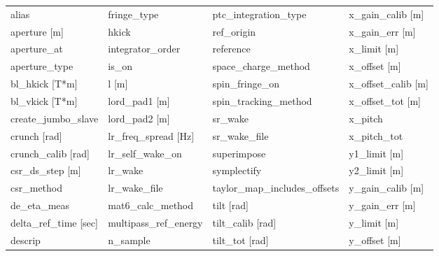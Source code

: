  \begin{tabular}{llll} \toprule
alias                            & fringe_type                      & ptc_integration_type             & x_gain_calib [m]                 \\
aperture [m]                     & hkick                            & ref_origin                       & x_gain_err [m]                   \\
aperture_at                      & integrator_order                 & reference                        & x_limit [m]                      \\
aperture_type                    & is_on                            & space_charge_method              & x_offset [m]                     \\
bl_hkick [T*m]                   & l [m]                            & spin_fringe_on                   & x_offset_calib [m]               \\
bl_vkick [T*m]                   & lord_pad1 [m]                    & spin_tracking_method             & x_offset_tot [m]                 \\
create_jumbo_slave               & lord_pad2 [m]                    & sr_wake                          & x_pitch                          \\
crunch [rad]                     & lr_freq_spread [Hz]              & sr_wake_file                     & x_pitch_tot                      \\
crunch_calib [rad]               & lr_self_wake_on                  & superimpose                      & y1_limit [m]                     \\
csr_ds_step [m]                  & lr_wake                          & symplectify                      & y2_limit [m]                     \\
csr_method                       & lr_wake_file                     & taylor_map_includes_offsets      & y_gain_calib [m]                 \\
de_eta_meas                      & mat6_calc_method                 & tilt [rad]                       & y_gain_err [m]                   \\
delta_ref_time [sec]             & multipass_ref_energy             & tilt_calib [rad]                 & y_limit [m]                      \\
descrip                          & n_sample                         & tilt_tot [rad]                   & y_offset [m]                     \\

\end{tabular}
